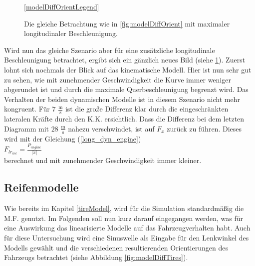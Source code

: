 \documentclass{like}
\begin{document}
\begin{figure}
	\centering
	\subfigure{
		 
	}%
	\subfigure{
		 
	}	
	\ref{modelDiffOrientLegend}
	\caption{Die gleiche Betrachtung wie in \ref{fig:modelDiffOrient} mit maximaler longitudinaler Beschleunigung.}\label{fig:modelDiffOrientMaxAcc}
\end{figure}

Wird nun das gleiche Szenario aber für eine zusätzliche longitudinale Beschleunigung betrachtet, ergibt sich ein gänzlich neues Bild (siehe \ref{fig:modelDiffOrientMaxAcc}).
Zuerst lohnt sich nochmals der Blick auf das kinematische Modell. Hier ist nun sehr gut zu sehen, wie mit zunehmender Geschwindigkeit die Kurve immer weniger abgerundet ist und durch die maximale Querbeschleunigung begrenzt wird. Das Verhalten der beiden dynamischen Modelle ist in diesem Szenario nicht mehr kongruent. Für $7$ $\frac{\text{m}}{\text{s}}$ ist die große Differenz klar durch die eingeschränkten lateralen Kräfte durch den \ac{K.K.} ersichtlich. Dass die Differenz bei dem letzten Diagramm mit $28$ $\frac{\text{m}}{\text{s}}$ nahezu verschwindet, ist auf $F_x$ zurück zu führen. Dieses wird mit der Gleichung (\ref{long_dyn_engine}) \\ 
$F_{lr_{acc}} = \frac{P_{engine}}{|\dot{x}|}$\\
berechnet und mit zunehmender Geschwindigkeit immer kleiner. 


\subsection{Reifenmodelle}
Wie bereits im Kapitel \ref{tireModel}, wird für die Simulation standardmäßig die \ac{M.F.} genutzt. Im Folgenden soll nun kurz darauf eingegangen werden, was für eine Auswirkung das linearisierte  Modelle auf das Fahrzeugverhalten habt. Auch für diese Untersuchung wird eine Sinuswelle als Eingabe für den Lenkwinkel des Modells gewählt und die verschiedenen resultierenden Orientierungen des Fahrzeugs betrachtet (siehe Abbildung \ref{fig:modelDiffTires}).
\end{document}
